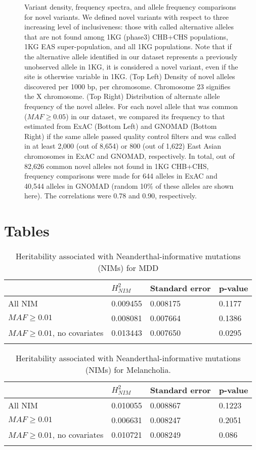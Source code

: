 \begin{figure}[!htb]
    \centering
    \caption{Variant density, frequency spectra, and allele frequency comparisons for novel variants. We defined novel variants with respect to three increasing level of inclusiveness: those
with called alternative alleles that are not found among 1KG (phase3) CHB+CHS populations, 1KG
EAS super-population, and all 1KG populations. Note that if the alternative allele identified in our
dataset represents a previously unobserved allele in 1KG, it is considered a novel variant, even if the
site is otherwise variable in 1KG. (Top Left) Density of novel alleles discovered per 1000 bp, per
chromosome. Chromosome 23 signifies the X chromosome. (Top Right) Distribution of alternate
allele frequency of the novel alleles. For each novel allele that was common ($MAF \ge 0.05$) in our
dataset, we compared its frequency to that estimated from ExAC (Bottom Left) and GNOMAD (Bottom Right) if the same allele passed quality control filters and was called in at least 2,000 (out of
8,654) or 800 (out of 1,622) East Asian chromosomes in ExAC and GNOMAD, respectively. In total,
out of 82,626 common novel alleles not found in 1KG CHB+CHS, frequency comparisons were made for 644 alleles in ExAC and 40,544 alleles in GNOMAD (random 10\% of these alleles are shown here). The correlations were 0.78 and 0.90, respectively.}
    \label{fig:2.2}
\end{figure}


\FloatBarrier
\clearpage
\section{Tables}
\begin{longtable}[]{@{}llll@{}}
\toprule
\endhead
& $H^2_{NIM}$ & Standard error & p-value\tabularnewline
\bottomrule
All NIM & 0.009455 & 0.008175 & 0.1177\tabularnewline
$MAF \ge 0.01$ & 0.008081 & 0.007664 & 0.1386\tabularnewline
$MAF\ge 0.01$, no covariates & 0.013443 & 0.007650 & 0.0295\tabularnewline
\bottomrule
\caption{Heritability associated with Neanderthal-informative mutations
(NIMs) for MDD}
\label{table:2.1}
\end{longtable}

\begin{longtable}[]{@{}llll@{}}
\toprule
\endhead
& $H^2_{NIM}$& Standard error & p-value\tabularnewline
\bottomrule
All NIM & 0.010055 & 0.008867 & 0.1223\tabularnewline
$MAF \ge 0.01$ & 0.006631 & 0.008247 &
0.2051\tabularnewline
$MAF \ge 0.01$, no covariates & 0.010721 & 0.008249 & 0.086\tabularnewline
\bottomrule
\caption{Heritability associated with Neanderthal-informative mutations (NIMs) for Melancholia.}
\label{table:2.2}
\end{longtable}

